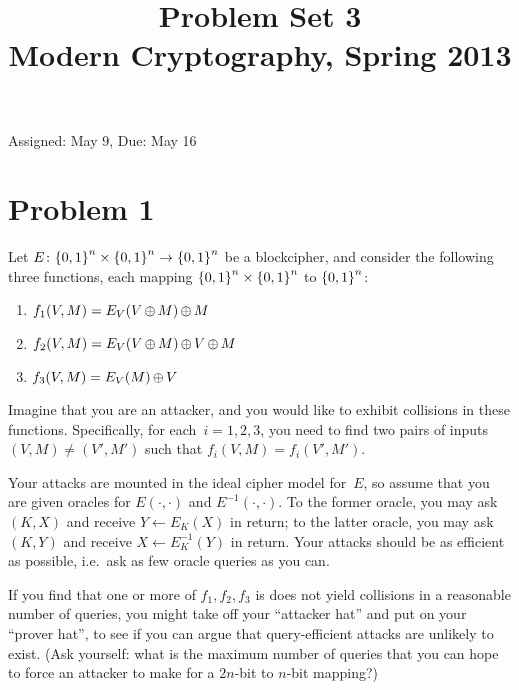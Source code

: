 \documentclass[11pt]{article}
\title{\bf Problem Set 3 \\[2ex] 
       \rm\normalsize Modern Cryptography, Spring 2013}
\date{}
\author{}
\begin{document}
\maketitle


\vspace*{-1in}

\begin{center}{Assigned: May 9, Due: May 16\\}
\end{center}

\section*{Problem 1}
Let $E \colon {\{0,1\}}^n \times {\{0,1\}}^n \to {\{0,1\}}^n$ be a blockcipher,
and consider the following three functions, each mapping ${\{0,1\}}^n
\times {\{0,1\}}^n$ to ${\{0,1\}}^n$:
\begin{enumerate}
\item $f_1(V,M) = E_V(V {\,\oplus\,} M) {\,\oplus\,} M$
\item $f_2(V,M) = E_V(V {\,\oplus\,} M) {\,\oplus\,} V {\,\oplus\,} M$
\item $f_3(V,M) = E_V(M) {\,\oplus\,} V$
\end{enumerate}
Imagine that you are an attacker, and you would like to exhibit
collisions in these functions.  Specifically, for each~$i=1,2,3$, you need
to find two pairs of inputs  $(V,M) \neq (V',M')$ such that
$f_i(V,M) = f_i(V',M')$.  

Your attacks are mounted in the ideal cipher
model for~$E$, so assume that you are given oracles for
$E(\cdot,\cdot)$ and $E^{-1}(\cdot,\cdot)$.  To the former oracle, you
may ask $(K,X)$ and receive $Y \gets E_K(X)$ in return; to the latter oracle,
you may ask $(K,Y)$ and receive $X \gets E^{-1}_K(Y)$ in return.  Your
attacks should be as efficient as possible, i.e.\ ask as few oracle
queries as you can.

If you find that one or more of $f_1,f_2,f_3$ is does not yield
collisions in a reasonable number of queries, you might take off your
``attacker hat'' and put on your ``prover hat'', to see if you can
argue that query-efficient attacks are unlikely to exist.  (Ask
yourself: what is the maximum number of queries that you can hope to
force an attacker to make for a $2n$-bit to $n$-bit mapping?)

\newcommand{\oPi}{\overline{\Pi}}
\newcommand{\ocalK}{\overline{\mathcal{K}}}
\newcommand{\ocalE}{\overline{\mathcal{E}}}
\newcommand{\ocalD}{\overline{\mathcal{D}}}
\end{document}
